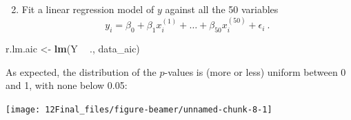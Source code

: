 \documentclass[10pt,ignorenonframetext,]{beamer}
\newenvironment{Shaded}{\begin{snugshade}}{\end{snugshade}}
\newcommand{\DataTypeTok}[1]{\textcolor[rgb]{0.13,0.29,0.53}{#1}}
\newcommand{\DecValTok}[1]{\textcolor[rgb]{0.00,0.00,0.81}{#1}}
\newcommand{\KeywordTok}[1]{\textcolor[rgb]{0.13,0.29,0.53}{\textbf{#1}}}
\newcommand{\NormalTok}[1]{#1}
\newcommand{\OperatorTok}[1]{\textcolor[rgb]{0.81,0.36,0.00}{\textbf{#1}}}
\newcommand{\StringTok}[1]{\textcolor[rgb]{0.31,0.60,0.02}{#1}}
\providecommand{\tightlist}{%
  \setlength{\itemsep}{0pt}\setlength{\parskip}{0pt}}
\begin{document}
\begin{frame}[fragile]

\begin{enumerate}
\setcounter{enumi}{1}
\tightlist
\item
  Fit a linear regression model of \(y\) against all the 50 variables
  \begin{equation*}
  y_i = \beta_0 + \beta_1 x_i^{(1)} + \ldots + \beta_{50}x_i^{(50)} + \epsilon_i \ .
  \end{equation*}
\end{enumerate}

\scriptsize

\begin{Shaded}
\begin{Highlighting}[]
\NormalTok{r.lm.aic <-}\StringTok{ }\KeywordTok{lm}\NormalTok{(Y }\OperatorTok{~}\StringTok{ }\NormalTok{., data_aic)}
\end{Highlighting}
\end{Shaded}

\normalsize

As expected, the distribution of the \(p\)-values is (more or less)
uniform between 0 and 1, with none below 0.05:

\scriptsize
\center

\begin{Shaded}
\end{Shaded}

\texttt{[image: 12Final\_files/figure-beamer/unnamed-chunk-8-1]}

\end{frame}
\end{document}
